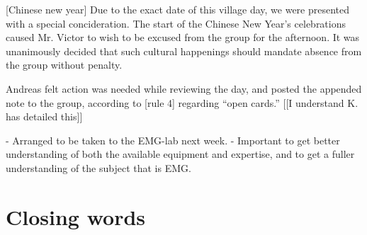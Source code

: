 \documentclass[a4paper, oneside, fleqn, halfparskip]{scrartcl}
\begin{document}



[Chinese new year]
Due to the exact date of this village day, we were presented with a special concideration. The start of the Chinese New Year's celebrations caused Mr. Victor to wish to be excused from the group for the afternoon. It was unanimously decided that such cultural happenings should mandate absence from the group without penalty.


Andreas felt action was needed while reviewing the day, and posted the appended note to the group, according to [rule 4] regarding ``open cards.'' [[I understand K. has detailed this]]

- Arranged to be taken to the EMG-lab next week.
- Important to get better understanding of both the available equipment and expertise, and to get a fuller understanding of the subject that is EMG. 

\section{Closing words}


\end{document}
